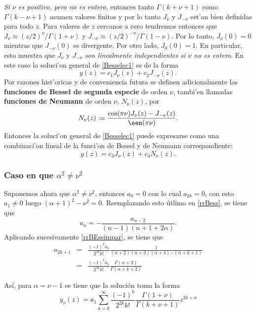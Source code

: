 \textit{Si $\nu$ es positivo, pero no es entero}, entonces tanto $\Gamma(k+\nu+1)$ como $\Gamma(k-\nu+1)$ asumen valores finitos y por lo tanto $J_\nu$ y $J_{-\nu}$ est'an bien definidas para todo $z$. Para valores de $z$ cercanos a cero tendremos entonces que $J_\nu\approx (z/2)^\nu/\Gamma(1+\nu)$ y $J_{-\nu}\approx (z/2)^{-\nu}/\Gamma(1-\nu)$. Por lo tanto, $J_\nu(0)=0$ mientras que  $J_{-\nu}(0)$ es divergente. Por otro lado, $J_0(0)=1$. En particular, esto muestra que $J_\nu$ y $J_{-\nu}$ \textit{son linealmente independientes si $\nu$ no es entero}.
En este caso la soluci'on general de \eqref{Besselec1} es de la forma
\begin{equation}
y(z)=c_1J_\nu(z)+c_2J_{-\nu}(z).
\end{equation}
Por razones hist'oricas y de conveniencia futura se definen adicionalmente las \textbf{funciones de Bessel de segunda especie} de orden $\nu$, tambi'en llamadas \textbf{funciones de Neumann} de orden $\nu$, $N_\nu(z)$, por
\begin{equation}
N_\nu(z):=\frac{\cos(\pi\nu)J_\nu(z)-J_{-\nu}(z)}{\sen(\pi\nu)}.
\end{equation}
Entonces la soluci'on general de \eqref{Besselec1} puede expresarse como una combinaci'on lineal de la funci'on de Bessel y de Neumann correspondiente:
\begin{equation}
y(z)=c_3J_\nu(z)+c_4N_\nu(z).
\end{equation}

\subsubsection{Caso en que $\alpha^2\neq\nu^2$}
Suponemos ahora que $\alpha^2\neq\nu^2$, entonces $a_0=0$ con lo cual $a_{2k}= 0$, con esto $a_1\neq 0$ luego $(\alpha+1)^2-\nu^2=0$. Reemplazando esto \'utlimo en \eqref{rrBess}, se tiene que
\begin{equation} \label{rrBEssimpar}
a_n=-\frac{a_{n-2}}{(n-1)(n+1+2\alpha)}.
\end{equation}
Aplicando sucesivamente \eqref{rrBEssimpar}, se tiene que
\begin{eqnarray}
a_{2k+1}&=&\frac{(-1)^ka_1}{2^{2k}k!}\frac{1}{(\alpha+2)(\alpha+3)(\alpha+4)\cdots (\alpha +k+1)}\\
&=&\frac{(-1)^ka_1}{2^{2k }k!}\frac{\Gamma(\alpha+2)}{\Gamma(\alpha+k+2)}
\end{eqnarray}

As\'i, para $\alpha=\nu-1$ se tiene que la soluci\'on toma la forma
\begin{equation}
y_\nu(z) = a_1 \sum_{k=0}^\infty \frac{(-1)^k}{2^{2k}k!}\frac{\Gamma(1+\nu)}{\Gamma(k+\nu+ 1) }
z^{2k+\nu}
\end{equation}

